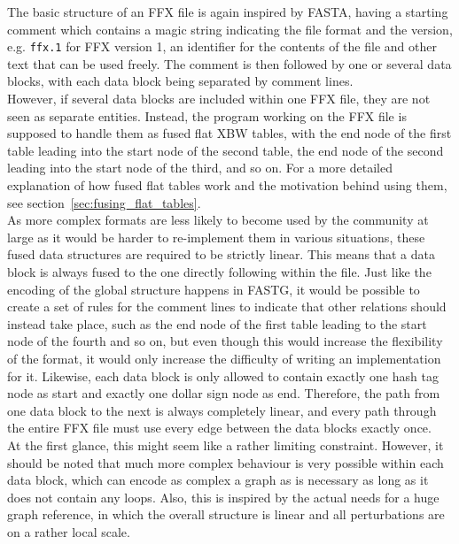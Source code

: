 \documentclass[a4paper,12pt,twoside,BCOR=10mm]{scrbook}
\begin{document}
The basic structure of an FFX file is again inspired by FASTA,
having a starting comment which contains a magic string indicating the
file format and the version, e.g. \texttt{ffx.1} for FFX version 1, an identifier for
the contents of the file and other text that can be used freely.
The comment is then followed by one or several data blocks,
with each data block being separated by comment lines. \\
However, if several data blocks are included within one FFX file,
they are not seen as separate entities. Instead, the program working on
the FFX file is supposed to handle them as fused flat XBW tables,
with the end node of the first table leading into the start node of the
second table, the end node of the second leading into the start node of the
third, and so on.
For a more detailed explanation of how fused
flat tables work and the motivation behind using them,
see section~\ref{sec:fusing_flat_tables}. \\
As more complex formats are less likely to become
used by the community at large as it would be harder to re-implement them
in various situations, these fused data structures are required to be strictly linear.
This means that a data block is always fused to the one directly following
within the file.
Just like the encoding of the global structure happens in FASTG,
it would be possible to create a set of rules for the comment
lines to indicate that other relations should instead take place, such as the
end node of the first table leading to the start node of the fourth and so on,
but even though this would increase the flexibility of the format, it would only
increase the difficulty of writing an implementation for it.
Likewise, each data block is only allowed to contain exactly one hash tag node
as start and exactly one dollar sign node as end. Therefore, the path from one
data block to the next is always completely linear, and every path through the
entire FFX file must use every edge between the data blocks exactly once. \\
At the first glance, this might seem like a rather limiting constraint.
However, it should be noted that much more complex behaviour is very possible
within each data block, which can encode as complex a graph as is necessary
as long as it does not contain any loops.
Also, this is inspired by the actual needs for a huge graph reference,
in which the overall structure is linear and all perturbations are on a
rather local scale.

\pagebreak
\end{document}
